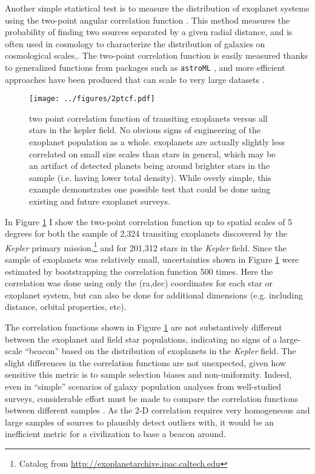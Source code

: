 \documentclass[twocolumn]{aastex62}
\newcommand{\Kepler}{\textsl{Kepler}\xspace}
\begin{document}
Another simple statistical test is to measure the distribution of exoplanet systems using the two-point angular correlation function \citep{landy1993}. This method measures the probability of finding two sources separated by a given radial distance, and is often used in cosmology to characterize the distribution of galaxies on cosmological scales,. The two-point correlation function is easily measured thanks to generalized functions from packages such as {\tt astroML} \citep{astroMLText}, and  more efficient approaches have been produced that can scale to very large datasets \citep[e.g.][]{wang2013}.


\begin{figure}[!t]
\centering
\texttt{[image: ../figures/2ptcf.pdf]}
\caption{two point correlation function of transiting exoplanets versus all stars in the kepler field. No obvious signs of engineering of the exoplanet population as a whole. exoplanets are actually slightly less correlated on small size scales than stars in general, which may be an artifact of detected planets being around brighter stars in the sample (i.e. having lower total density). 
While overly simple, this example demonstrates one possible test that could be done using existing and future exoplanet surveys.}
\label{fig:2pt}
\end{figure}



In Figure \ref{fig:2pt} I show the two-point correlation function up to spatial scales of 5 degrees for both the sample of 2,324 transiting exoplanets discovered by the \Kepler primary mission,\footnote{Catalog from \url{http://exoplanetarchive.ipac.caltech.edu}} and for 201,312 stars in the \Kepler field. Since the sample of exoplanets was relatively small, uncertainties shown in Figure \ref{fig:2pt} were estimated by bootstrapping the correlation function 500 times. Here the correlation was done using only the (ra,dec) coordinates for each star or exoplanet system, but can also be done for additional dimensions (e.g. including distance, orbital properties, etc).


The correlation functions shown in Figure \ref{fig:2pt} are not substantively different between the exoplanet and field star populations, indicating no signs of a large-scale ``beacon'' based on the distribution of exoplanets in the \Kepler field. The slight differences in the correlation functions are not unexpected, given how sensitive this metric is to sample selection biases and non-uniformity. Indeed, even in ``simple'' scenarios of galaxy population analyses from well-studied surveys, considerable effort must be made to compare the correlation functions between different samples \citep[e.g.][]{wang2013}. As the 2-D correlation requires very homogeneous and large samples of sources to plausibly detect outliers with, it would be an inefficient metric for a civilization to base a beacon around. 
\end{document}
